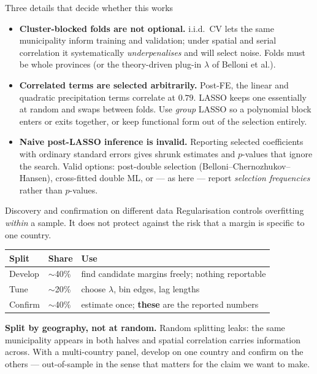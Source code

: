 \documentclass[10pt, aspectratio=169]{beamer}
\begin{document}
\begin{frame}{Three details that decide whether this works}
  \begin{itemize}
    \item \textbf{Cluster-blocked folds are not optional.} i.i.d.\ CV lets the
          same municipality inform training and validation; under spatial and
          serial correlation it systematically \emph{underpenalises} and will
          select noise. Folds must be whole provinces (or the theory-driven
          plug-in $\lambda$ of Belloni et al.).
    \item \textbf{Correlated terms are selected arbitrarily.} Post-FE, the
          linear and quadratic precipitation terms correlate at $0.79$. LASSO
          keeps one essentially at random and swaps between folds. Use
          \emph{group} LASSO so a polynomial block enters or exits together,
          or keep functional form out of the selection entirely.
    \item \textbf{Naive post-LASSO inference is invalid.} Reporting selected
          coefficients with ordinary standard errors gives shrunk estimates
          and $p$-values that ignore the search. Valid options: post-double
          selection (Belloni--Chernozhukov--Hansen), cross-fitted double ML,
          or --- as here --- report \emph{selection frequencies} rather than
          $p$-values.
  \end{itemize}
\end{frame}

\begin{frame}{Discovery and confirmation on different data}
  Regularisation controls overfitting \emph{within} a sample. It does not
  protect against the risk that a margin is specific to one country.
  \begin{center}
    \small
    \begin{tabular}{lll}
      \toprule
      Split & Share & Use \\
      \midrule
      Develop & $\sim$40\% & find candidate margins freely; nothing reportable \\
      Tune    & $\sim$20\% & choose $\lambda$, bin edges, lag lengths \\
      Confirm & $\sim$40\% & estimate once; \textbf{these} are the reported numbers \\
      \bottomrule
    \end{tabular}
  \end{center}
  \vspace{0.5em}
  \textbf{Split by geography, not at random.} Random splitting leaks: the same
  municipality appears in both halves and spatial correlation carries
  information across. With a multi-country panel, develop on one country and
  confirm on the others --- out-of-sample in the sense that matters for the
  claim we want to make.
\end{frame}
\end{document}
